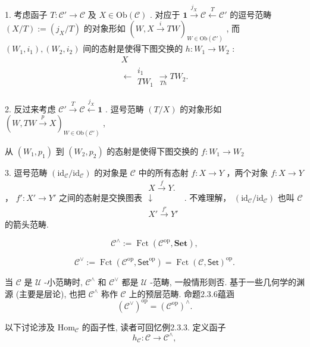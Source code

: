 \documentclass[]{article}
\begin{document}
1. 考虑函子 $T: \mathcal{C}' \to \mathcal{C}$ 及 $X \in \mathrm{Ob}(\mathcal{C})$ . 对应于 $\mathbf{1} \xrightarrow{j_X} \mathcal{C} \xleftarrow{T} \mathcal{C}'$ 的逗号范畴 $(X/T) := (j_X/T)$ 的对象形如 $(W, X \xrightarrow{i} TW)_{W \in \mathrm{Ob}(\mathcal{C}')}$ , 而 $(W_1, i_1), (W_2, i_2)$ 间的态射是使得下图交换的 $h: W_1 \to W_2$ : $$
\begin{array}{c} X \\ \leftarrow \begin{array}{c} i _ {1} \\ T W _ {1} \end{array} \xrightarrow [ T h ]{} T W _ {2}. \end{array}
$$

2. 反过来考虑 $\mathcal{C}' \xrightarrow{T} \mathcal{C} \xleftarrow{j_X} \mathbf{1}$ . 逗号范畴 $(T / X)$ 的对象形如 $(W, TW \xrightarrow{p} X)_{W \in \mathrm{Ob}(\mathcal{C}')}$ , 

从 $(W_{1},p_{1})$ 到 $(W_{2},p_{2})$ 的态射是使得下图交换的 $f:W_1\to W_2$ 

3. 逗号范畴 $(\mathrm{id}_{\mathcal{C}} / \mathrm{id}_{\mathcal{C}})$ 的对象是 $\mathcal{C}$ 中的所有态射 $f: X \to Y$ ，两个对象 $f: X \to Y$ ， $f': X' \to Y'$ 之间的态射是交换图表 $\begin{array}{c}X \xrightarrow{f} Y. \\ \downarrow \\ X' \xrightarrow{f'} Y' \end{array}$ . 不难理解， $(\mathrm{id}_{\mathcal{C}} / \mathrm{id}_{\mathcal{C}})$ 也叫 $\mathcal{C}$ 的箭头范畴. 

$$
\mathcal {C} ^ {\wedge} := \operatorname{Fct} (\mathcal {C} ^ {\mathrm{op}}, \mathbf {S e t}),
$$

$$
\mathcal {C} ^ {\vee} := \operatorname{Fct} (\mathcal {C} ^ {\mathrm{op}}, \mathsf {S e t} ^ {\mathrm{op}}) = \operatorname{Fct} (\mathcal {C}, \mathsf {S e t}) ^ {\mathrm{op}}.
$$

当 $\mathcal{C}$ 是 $\mathcal{U}$ -小范畴时, $\mathcal{C}^{\wedge}$ 和 $\mathcal{C}^{\vee}$ 都是 $\mathcal{U}$ -范畴, 一般情形则否. 基于一些几何学的渊源 (主要是层论), 也把 $\mathcal{C}^{\wedge}$ 称作 $\mathcal{C}$ 上的预层范畴. 命题2.3.6蕴涵 $$
(\mathcal {C} ^ {\vee}) ^ {\mathrm{op}} = (\mathcal {C} ^ {\mathrm{op}}) ^ {\wedge}.  
$$

以下讨论涉及 $\mathrm{Hom}_{\mathcal{C}}$ 的函子性, 读者可回忆例2.3.3. 定义函子 $$
h _ {\mathcal {C}}: \mathcal {C} \longrightarrow \mathcal {C} ^ {\wedge},
$$
\end{document}
